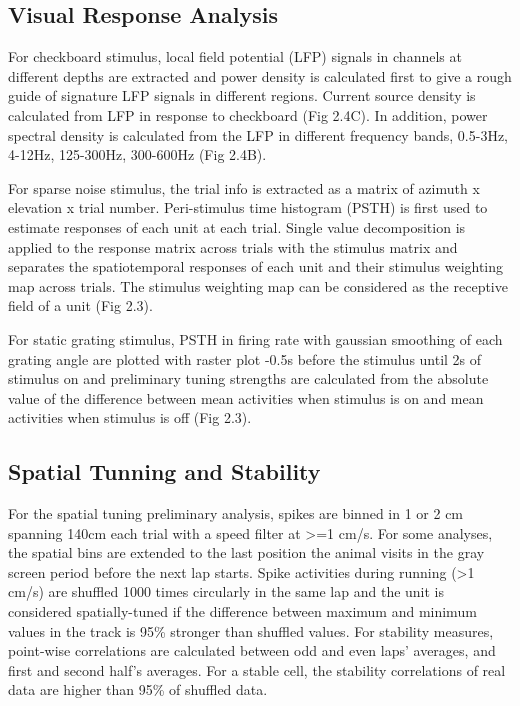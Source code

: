 \subsection{Visual Response Analysis}
For checkboard stimulus, local field potential (LFP) signals in channels at different depths are extracted and power density is calculated first to give a rough guide of signature LFP signals in different regions. Current source density is calculated from LFP in response to checkboard (Fig 2.4C). In addition, power spectral density is calculated from the LFP in different frequency bands, 0.5-3Hz, 4-12Hz, 125-300Hz, 300-600Hz (Fig 2.4B).

For sparse noise stimulus, the trial info is extracted as a matrix of azimuth x elevation x trial number. Peri-stimulus time histogram (PSTH) is first used to estimate responses of each unit at each trial. Single value decomposition is applied to the response matrix across trials with the stimulus matrix and separates the spatiotemporal responses of each unit and their stimulus weighting map across trials. The stimulus weighting map can be considered as the receptive field of a unit (Fig 2.3).

For static grating stimulus, PSTH in firing rate with gaussian smoothing of each grating angle are plotted with raster plot -0.5s before the stimulus until 2s of stimulus on and preliminary tuning strengths are calculated from the absolute value of the difference between mean activities when stimulus is on and mean activities when stimulus is off (Fig 2.3).

\subsection{Spatial Tunning and Stability}
For the spatial tuning preliminary analysis, spikes are binned in 1 or 2 cm spanning 140cm each trial with a speed filter at >=1 cm/s. For some analyses, the spatial bins are extended to the last position the animal visits in the gray screen period before the next lap starts. Spike activities during running (>1 cm/s) are shuffled 1000 times circularly in the same lap and the unit is considered spatially-tuned if the difference between maximum and minimum values in the track is 95\% stronger than shuffled values. For stability measures, point-wise correlations are calculated between odd and even laps' averages, and first and second half's averages. For a stable cell, the stability correlations of real data are higher than 95\% of shuffled data. 

